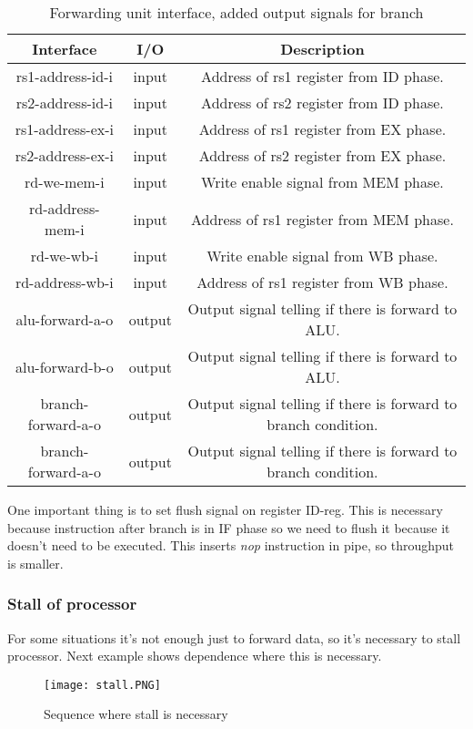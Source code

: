 \documentclass{scrreprt}
\begin{document}
        \begin{table}[htb!]
            \centering
            \begin{tabular}{|c|c|c|} \hline 
             Interface & I/O & Description \\ \hline  
             rs1-address-id-i & input & Address of rs1 register from ID phase. \\ \hline  
             rs2-address-id-i & input & Address of rs2 register from ID phase.  \\ \hline
             rs1-address-ex-i & input & Address of rs1 register from EX phase. \\ \hline
             rs2-address-ex-i & input & Address of rs2 register from EX phase. \\ \hline
             rd-we-mem-i & input & Write enable signal from MEM phase. \\ \hline
             rd-address-mem-i & input & Address of rs1 register from MEM phase. \\ \hline
             rd-we-wb-i & input & Write enable signal from WB phase. \\ \hline
             rd-address-wb-i & input & Address of rs1 register from WB phase. \\ \hline
             alu-forward-a-o & output & Output signal telling if there is forward to ALU. \\ \hline
             alu-forward-b-o & output & Output signal telling if there is forward to ALU. \\ \hline
             branch-forward-a-o & output & Output signal telling if there is forward to branch condition. \\ \hline
             branch-forward-a-o & output & Output signal telling if there is forward to branch condition. \\ \hline
        \end{tabular}
        \caption{Forwarding unit interface, added output signals for branch}
        \label{tab:ForwardingB}
    \end{table}
    \hfill \break
    \hfill \break
    One important thing is to set flush signal on register ID-reg. This is necessary because instruction after branch is in IF phase so we need to flush it because it doesn't need to be executed. This inserts \textit{nop} instruction in pipe, so throughput is smaller. 
    \subsubsection*{Stall of processor}
    For some situations it's not enough just to forward data, so it's necessary to stall processor. Next example shows dependence where this is necessary. 
    \begin{figure}[htb!]
        \centering
        \texttt{[image: stall.PNG]}
        \caption{Sequence where stall is necessary}
        \label{fig:stall}
    \end{figure}
\end{document}

